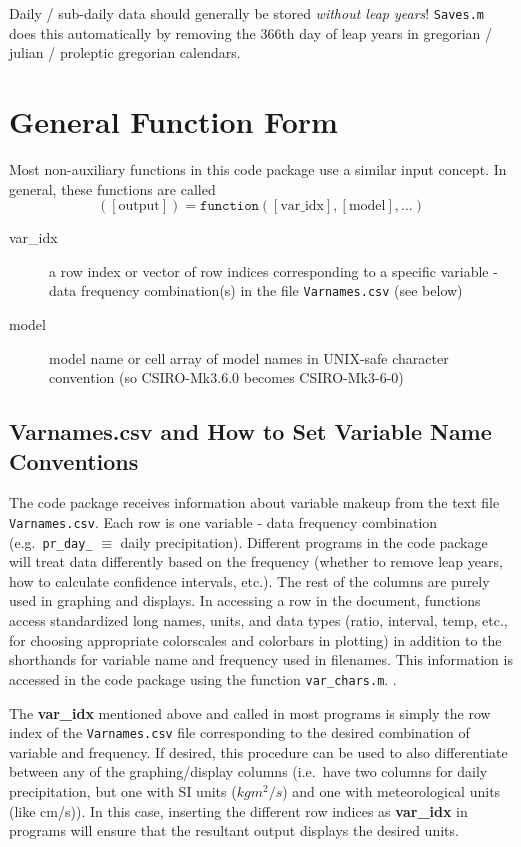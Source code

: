 \documentclass{article}
\begin{document}
Daily / sub-daily data should generally be stored \textit{without leap years}! \texttt{Saves.m} does this automatically by removing the 366th day of leap years in gregorian / julian / proleptic gregorian calendars. 

\section{General Function Form} %
Most non-auxiliary functions in this code package use a similar input concept. In general, these functions are called 
\begin{equation}
([\text{output}]) = \texttt{function}([\text{var\_idx}],[\text{model}],\dots)
\end{equation}

\begin{description}
\item [var\_idx] a row index or vector of row indices corresponding to a specific variable - data frequency combination(s) in the file \texttt{Varnames.csv} (see below)
\item [model] model name or cell array of model names in UNIX-safe character convention (so CSIRO-Mk3.6.0 becomes CSIRO-Mk3-6-0)
\end{description}

\subsection{Varnames.csv and How to Set Variable Name Conventions}\label{func:Varnames.csv}
The code package receives information about variable makeup from the text file \texttt{Varnames.csv}. Each row is one variable - data frequency combination (e.g.\ \texttt{pr\_day\_} $\equiv$ daily precipitation). Different programs in the code package will treat data differently based on the frequency (whether to remove leap years, how to calculate confidence intervals, etc.). The rest of the columns are purely used in graphing and displays. In accessing a row in the document, functions access standardized long names, units, and data types (ratio, interval, temp, etc., for choosing appropriate colorscales and colorbars in plotting) in addition to the shorthands for variable name and frequency used in filenames. This information is accessed in the code package using the function \texttt{var\_chars.m}. . 

The \textbf{var\_idx} mentioned above and called in most programs is simply the row index of the \texttt{Varnames.csv} file corresponding to the desired combination of variable and frequency. If desired, this procedure can be used to also differentiate between any of the graphing/display columns (i.e.\ have two columns for daily precipitation, but one with SI units ($kgm^2/s$) and one with meteorological units (like cm/s)). In this case, inserting the different row indices as \textbf{var\_idx} in programs will ensure that the resultant output displays the desired units. 
\end{document}
